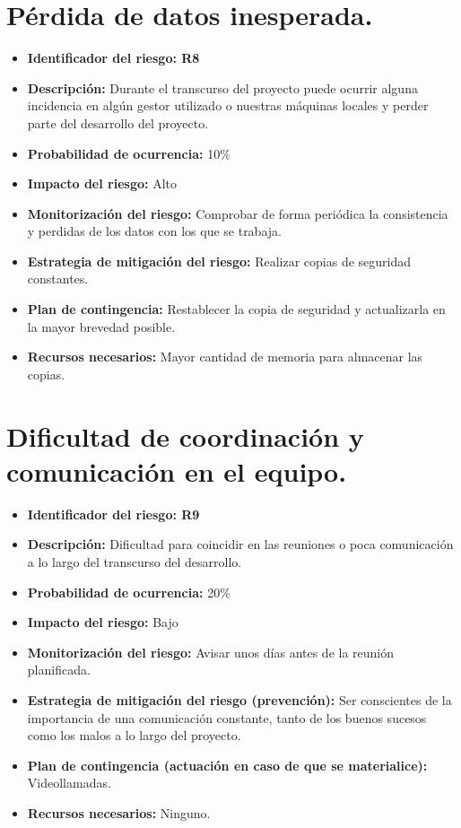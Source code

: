 \section{Pérdida de datos inesperada.}
\begin{itemize}
	\item \textbf{Identificador del riesgo: R8}
	\item \textbf{Descripción: } Durante el transcurso del proyecto puede ocurrir alguna incidencia en algún gestor utilizado o nuestras máquinas locales y perder parte del desarrollo del proyecto.
	\item \textbf{Probabilidad de ocurrencia: } 10\%
	\item \textbf{Impacto del riesgo: } Alto
	\item \textbf{Monitorización del riesgo: } Comprobar de forma periódica la consistencia y perdidas de los datos con los que se trabaja.
	\item \textbf{Estrategia de mitigación del riesgo: } Realizar copias de seguridad constantes.
	\item \textbf{Plan de contingencia: } Restablecer la copia de seguridad y actualizarla en la mayor brevedad posible.
	\item \textbf{Recursos necesarios: } Mayor cantidad de memoria para almacenar las copias.
\end{itemize}

\section{Dificultad de coordinación y comunicación en el equipo.}
\begin{itemize}
	\item \textbf{Identificador del riesgo: R9}
	\item \textbf{Descripción: } Dificultad para coincidir en las reuniones o poca comunicación a lo largo del transcurso del desarrollo.
	\item \textbf{Probabilidad de ocurrencia: } 20\%
	\item \textbf{Impacto del riesgo: } Bajo
	\item \textbf{Monitorización del riesgo: } Avisar unos días antes de la reunión planificada.
	\item \textbf{Estrategia de mitigación del riesgo (prevención): } Ser conscientes de la importancia de una comunicación constante, tanto de los buenos sucesos como los malos a lo largo del proyecto.
	\item \textbf{Plan de contingencia (actuación en caso de que se materialice): } Videollamadas.
	\item \textbf{Recursos necesarios: } Ninguno.
\end{itemize}

